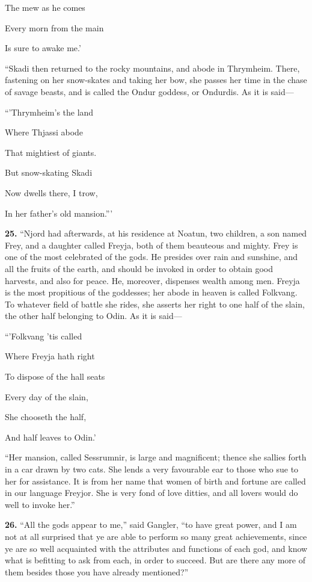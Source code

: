 The mew as he comes

Every morn from the main

Is sure to awake me.'

``Skadi then returned to the rocky mountains, and abode in Thrymheim.
There, fastening on her snow-skates and taking her bow, she passes her
time in the chase of savage beasts, and is called the Ondur goddess,
or Ondurdis. As it is said—

``'Thrymheim's the land

Where Thjassi abode

That mightiest of giants.

But snow-skating Skadi

Now dwells there, I trow,

In her father's old mansion.'''


\textbf{25.} ``Njord had afterwards, at his residence at Noatun, two children,
a son named Frey, and a daughter called Freyja, both of them beauteous
and mighty. Frey is one of the most celebrated of the gods. He
presides over rain and sunshine, and all the fruits of the earth, and
should be invoked in order to obtain good harvests, and also for
peace. He, moreover, dispenses wealth among men. Freyja is the most
propitious of the goddesses; her abode in heaven is called Folkvang.
To whatever field of battle she rides, she asserts her right to one
half of the slain, the other half belonging to Odin. As it is said—

``'Folkvang 'tis called

Where Freyja hath right

To dispose of the hall seats

Every day of the slain,

She chooseth the half,

And half leaves to Odin.'

``Her mansion, called Sessrumnir, is large and magnificent; thence she
sallies forth in a car drawn by two cats. She lends a very favourable
ear to those who sue to her for assistance. It is from her name that
women of birth and fortune are called in our language Freyjor. She is
very fond of love ditties, and all lovers would do well to invoke
her.''


\textbf{26.} ``All the gods appear to me,'' said Gangler, ``to have great power,
and I am not at all surprised that ye are able to perform so many
great achievements, since ye are so well acquainted with the
attributes and functions of each god, and know what is befitting to
ask from each, in order to succeed. But are there any more of them
besides those you have already mentioned?''

